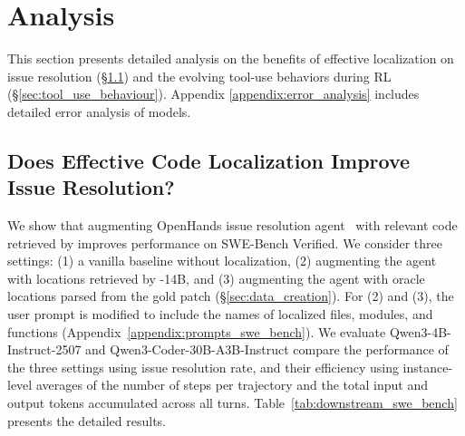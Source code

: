 \section{Analysis}
This section presents detailed analysis on the benefits of effective localization on issue resolution (\S\ref{sec:downstream_swebench}) and the evolving tool-use behaviors during RL (\S\ref{sec:tool_use_behaviour}). Appendix \ref{appendix:error_analysis} includes detailed error analysis of \methodname models.

\subsection{Does Effective Code Localization Improve Issue Resolution?}\label{sec:downstream_swebench}

% 
We show that augmenting OpenHands issue resolution agent~\citep{wang2025openhandssoftwareagentsdk} with relevant code retrieved by \methodname improves performance on SWE-Bench Verified. We consider three settings: (1) a vanilla baseline without localization, (2) augmenting the agent with locations retrieved by \methodname-14B, and (3) augmenting the agent with oracle locations parsed from the gold patch (\S\ref{sec:data_creation}). 
For (2) and (3), the user prompt is modified to include the names of localized files, modules, and functions (Appendix~\ref{appendix:prompts_swe_bench}). We evaluate Qwen3-4B-Instruct-2507 and Qwen3-Coder-30B-A3B-Instruct compare the performance of the three settings using issue resolution rate, and their efficiency using instance-level averages of the number of steps per trajectory and the total input and output tokens accumulated across all turns. Table~\ref{tab:downstream_swe_bench} presents the detailed results.
